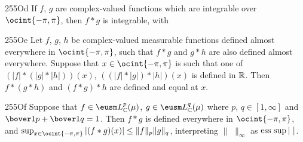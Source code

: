 
\spheader 255Od If $f$, $g$ are complex-valued
functions which are integrable over $\ocint{-\pi,\pi}$, then $f*g$ is
integrable, with


\spheader 255Oe Let $f$, $g$, $h$ be complex-valued measurable
functions defined almost everywhere in $\ocint{-\pi,\pi}$, such that $f*g$
and $g*h$ are also defined almost everywhere.   Suppose
that $x\in\ocint{-\pi,\pi}$ is such that one of $(|f|*(|g|*|h|))(x)$,
$((|f|*|g|)*|h|)(x)$ is defined in $\Bbb R$.   Then $f*(g*h)$ and
$(f*g)*h$ are defined and equal at $x$.

\spheader 255Of Suppose that $f\in\eusm L^p_{\Bbb C}(\mu)$,
$g\in\eusm L^{q}_{\Bbb C}(\mu)$ where $p$, $q\in[1,\infty]$ and
$\bover1p+\bover1{q}=1$.   Then $f*g$ is defined
everywhere in $\ocint{-\pi,\pi}$, and
$\sup_{x\in\ocint{-\pi,\pi}}|(f*g)(x)|\le\|f\|_p\|g\|_q$, interpreting
$\|\,\,\|_{\infty}$ as $\mathop{\text{ess sup}} |\,\,|$.

